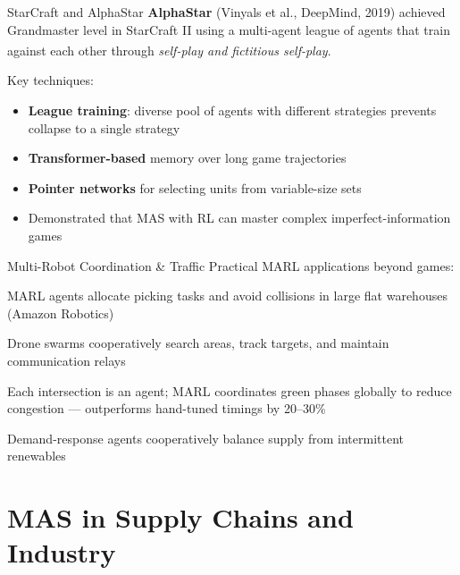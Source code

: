\begin{v3topic}{StarCraft and AlphaStar}
    \textbf{AlphaStar} (Vinyals et al., DeepMind, 2019) achieved Grandmaster
    level in StarCraft II using a multi-agent league of agents that
    train against each other through \emph{self-play and fictitious
    self-play}.\textsuperscript{\cite[][Ch.~18]{weissMultiagentSystems2013}}

    Key techniques:
    \begin{itemize}
        \item \textbf{League training}: diverse pool of agents with different strategies
              prevents collapse to a single strategy
        \item \textbf{Transformer-based} memory over long game trajectories
        \item \textbf{Pointer networks} for selecting units from variable-size sets
        \item Demonstrated that MAS with RL can master complex imperfect-information games
    \end{itemize}

\end{v3topic}
\begin{v3topic}{Multi-Robot Coordination \& Traffic}
    Practical MARL applications beyond games:
    \begin{description}[leftmargin=0.6cm, labelindent=0pt]
        \item[\textbf{Warehouse robots}] MARL agents allocate picking tasks and
              avoid collisions in large flat warehouses (Amazon Robotics)
        \item[\textbf{Multi-UAV mission}] Drone swarms cooperatively search areas,
              track targets, and maintain communication relays
        \item[\textbf{Traffic signal control}] Each intersection is an agent;
              MARL coordinates green phases globally to reduce
              congestion --- outperforms hand-tuned timings by 20--30\%
        \item[\textbf{Energy grid}] Demand-response agents cooperatively balance
              supply from intermittent renewables
    \end{description}

\end{v3topic}

\section{MAS in Supply Chains and Industry}

